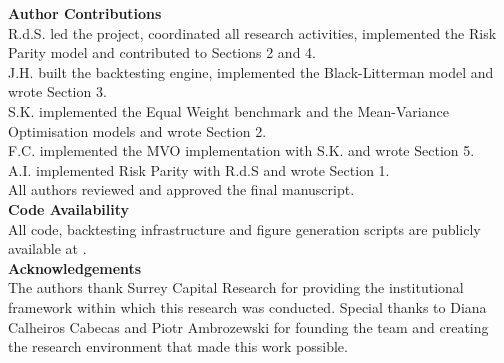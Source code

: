 \documentclass[a4paper,alpha-refs]{scr-contemporary}
\numberwithin{equation}{section}
\begin{document}
\noindent\textbf{Author Contributions} \\
\indent R.d.S. led the project, coordinated all research activities, implemented the Risk Parity
model and contributed to Sections 2 and 4. \\
\indent J.H. built the backtesting engine, implemented the Black-Litterman model and wrote
Section 3. \\
\indent S.K. implemented the Equal Weight benchmark and the Mean-Variance Optimisation models
and wrote Section 2. \\
\indent F.C. implemented the MVO implementation with S.K. and wrote Section 5. \\
\indent A.I. implemented Risk Parity with R.d.S and wrote Section 1. \\
\indent All authors reviewed and approved the final manuscript. \\

\noindent\textbf{Code Availability} \\
\indent All code, backtesting infrastructure and figure generation scripts are
publicly available at \citep{scr_repo}. \\

\noindent\textbf{Acknowledgements} \\
\indent The authors thank Surrey Capital Research for providing the institutional framework
within which this research was conducted. \newline 
\indent Special thanks to Diana Calheiros Cabecas and Piotr Ambrozewski for founding 
the team and creating the research environment that made this work possible.

\newpage


\end{document}
